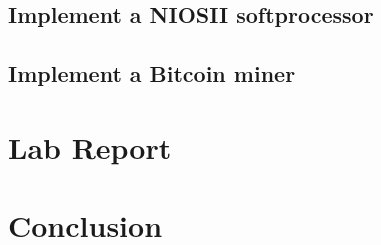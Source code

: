     \subsection{Implement a NIOSII softprocessor}
    \subsection{Implement a Bitcoin miner}
  \section{\bfseries Lab Report}
    
  \section{\bfseries Conclusion}
   
